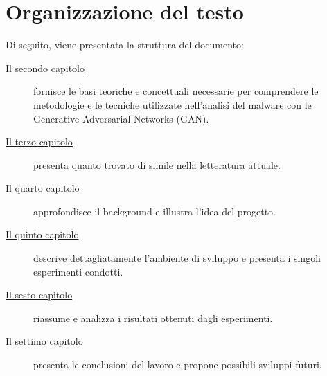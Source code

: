 \section{Organizzazione del testo}
\indent Di seguito, viene presentata la struttura del documento:
\begin{description}
    \item[{\hyperref[cap:background]{Il secondo capitolo}}] fornisce le basi teoriche e concettuali necessarie per comprendere le metodologie e le tecniche utilizzate nell'analisi del malware con le Generative Adversarial Networks (GAN).
    
    \item[{\hyperref[cap:RelatedWorks]{Il terzo capitolo}}] presenta quanto trovato di simile nella letteratura attuale.

    \item[{\hyperref[cap:descrizione]{Il quarto capitolo}}] approfondisce il background e illustra l'idea del progetto.
    
    \item[{\hyperref[cap:processi-metodologie]{Il quinto capitolo}}] descrive dettagliatamente l'ambiente di sviluppo e presenta i singoli esperimenti condotti.

    \item[{\hyperref[cap:risultati]{Il sesto capitolo}}] riassume e analizza i risultati ottenuti dagli esperimenti.
    
    \item[{\hyperref[cap:conclusioni]{Il settimo capitolo}}] presenta le conclusioni del lavoro e propone possibili sviluppi futuri.
\end{description}

